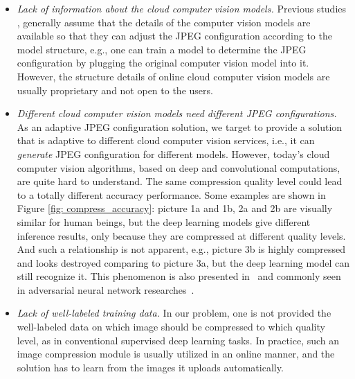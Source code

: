 \begin{itemize}

\item \emph{Lack of information about the cloud computer vision models.} Previous studies \cite{DeepN-JPEG,torfason2018towards,gueguen2018faster}, generally assume that the details of the computer vision models are available so that they can adjust the JPEG configuration according to the model structure, e.g., one can train a model to determine the JPEG configuration by plugging the original computer vision model into it. However, the structure details of online cloud computer vision models are usually proprietary and not open to the users. 

\item \emph{Different cloud computer vision models need different JPEG configurations.} As an adaptive JPEG configuration solution, we target to provide a solution that is adaptive to different cloud computer vision services, i.e., it can \emph{generate} JPEG configuration for different models. However, today's cloud computer vision algorithms, based on deep and convolutional computations, are quite hard to understand. The same compression quality level could lead to a totally different accuracy performance. Some examples are shown in Figure \ref{fig: compress_accuracy}: picture 1a and 1b, 2a and 2b are visually similar for human beings, but the deep learning models give different inference results, only because they are compressed at different quality levels. And such a relationship is not apparent, e.g., picture 3b is highly compressed and looks destroyed comparing to picture 3a, but the deep learning model can still recognize it. This phenomenon is also presented in~\cite{delac2005effects} and commonly seen in adversarial neural network researches~\cite{yuan2019adversarial, evtimov2018robust}.

\item \emph{Lack of well-labeled training data.} In our problem, one is not provided the well-labeled data on which image should be compressed to which quality level, as in conventional supervised deep learning tasks. In practice, such an image compression module is usually utilized in an online manner, and the solution has to learn from the images it uploads automatically. 
\end{itemize} 

